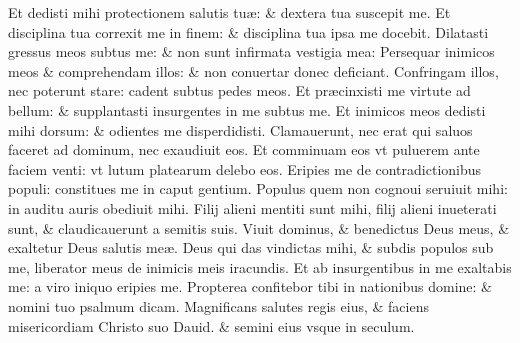 \documentclass[a5paper,10pt]{book}
\def\ae{æ}
\begin{document}
\begin{multicols*}{2}
\newline \color{red} E\color{black}t dedisti mihi protectionem salutis tu\ae : \& dextera tua suscepit me.
\newline \color{red} E\color{black}t disciplina tua correxit me in finem: \& disciplina tua ipsa me docebit.
\newline \color{red} D\color{black}ilatasti gressus meos subtus me: \& non sunt infirmata vestigia mea:
\newline \color{red} P\color{black}ersequar inimicos meos \& comprehendam illos: \& non conuertar donec deficiant.
\newline \color{red} C\color{black}onfringam illos, nec poterunt stare: cadent subtus pedes meos.
\newline \color{red} E\color{black}t pr\ae cinxisti me virtute ad bellum: \& supplantasti insurgentes in me subtus me.
\newline \color{red} E\color{black}t inimicos meos dedisti mihi dorsum: \& odientes me disperdidisti.
\newline \color{red} C\color{black}lamauerunt, nec erat qui saluos faceret ad dominum, nec exaudiuit eos.
\newline \color{red} E\color{black}t comminuam eos vt puluerem ante faciem venti: vt lutum platearum delebo eos.%
\newline \color{red} E\color{black}ripies me de contradictionibus populi: constitues me in caput gentium.
\newline \color{red} P\color{black}opulus quem non cognoui seruiuit mihi: in auditu auris obediuit mihi.
\newline \color{red} F\color{black}ilij alieni mentiti sunt mihi, filij alieni inueterati sunt, \& claudicauerunt a semitis suis.
\newline \color{red} V\color{black}iuit dominus, \& benedictus Deus meus, \& exaltetur Deus salutis me\ae .
\newline \color{red} D\color{black}eus qui das vindictas mihi, \& subdis populos sub me, liberator meus de inimicis meis iracundis.
\newline \color{red} E\color{black}t ab insurgentibus in me exaltabis me: a viro iniquo eripies me.
\newline \color{red} P\color{black}ropterea confitebor tibi in nationibus domine: \& nomini tuo psalmum dicam.
\newline \color{red} M\color{black}agnificans salutes regis eius, \& faciens misericordiam Christo suo Dauid. \& semini eius vsque in seculum.

\end{multicols*}
\end{document}
